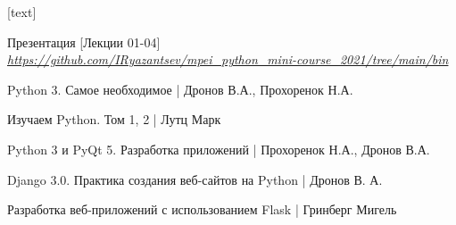[text]

\begin{thebibliography}{3}

Презентация [Лекции 01-04] \\
\vspace{0.2cm}
\textit{\href{https://github.com/IRyazantsev/mpei_python_mini-course_2021/tree/main/bin}{https://github.com/IRyazantsev/mpei\_python\_mini-course\_2021/tree/main/bin}}

Python 3. Самое необходимое | Дронов В.А., Прохоренок Н.А.

Изучаем Python. Том 1, 2 | Лутц Марк

Python 3 и PyQt 5. Разработка приложений | Прохоренок Н.А., Дронов В.А.

Django 3.0. Практика создания веб-сайтов на Python | Дронов В. А.

Разработка веб-приложений с использованием Flask | Гринберг Мигель

\end{thebibliography}